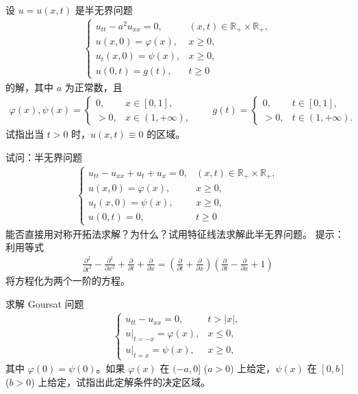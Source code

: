 \documentclass[../../main.tex]{subfiles}%
\begin{document}
\begin{example}
设 $u=u(x,t)$ 是半无界问题
\begin{align*}
\begin{cases}
u_{tt}-a^2u_{xx}=0, & (x,t)\in\mathbb{R}_+\times\mathbb{R}_+, \\
u(x,0)=\varphi(x), & x\geqslant 0, \\
u_t(x,0)=\psi(x), & x\geqslant 0, \\
u(0,t)=g(t), & t\geqslant 0
\end{cases}
\end{align*}
的解，其中 $a$ 为正常数，且
\begin{align*}
\varphi(x),\psi(x)=\begin{cases}
0, & x\in[0,1], \\
>0, & x\in(1,+\infty),
\end{cases}\qquad
g(t)=\begin{cases}
0, & t\in[0,1], \\
>0, & t\in(1,+\infty).
\end{cases}
\end{align*}
试指出当 $t>0$ 时，$u(x,t)\equiv 0$ 的区域。
\end{example}

\begin{example}
试问：半无界问题
\begin{align*}
\begin{cases}
u_{tt}-u_{xx}+u_t+u_x=0, & (x,t)\in\mathbb{R}_+\times\mathbb{R}_+, \\
u(x,0)=\varphi(x), & x\geqslant 0, \\
u_t(x,0)=\psi(x), & x\geqslant 0, \\
u(0,t)=0, & t\geqslant 0
\end{cases}
\end{align*}
能否直接用对称开拓法求解？为什么？试用特征线法求解此半无界问题。
提示：利用等式
\begin{align*}
\frac{\partial^2}{\partial t^2}-\frac{\partial^2}{\partial x^2}+\frac{\partial}{\partial t}+\frac{\partial}{\partial x}
=\left(\frac{\partial}{\partial t}+\frac{\partial}{\partial x}\right)\left(\frac{\partial}{\partial t}-\frac{\partial}{\partial x}+1\right)
\end{align*}
将方程化为两个一阶的方程。
\end{example}

\begin{example}
求解 Goursat 问题
\begin{align*}
\begin{cases}
u_{tt}-u_{xx}=0, & t>|x|, \\
u|_{t=-x}=\varphi(x), & x\leqslant 0, \\
u|_{t=x}=\psi(x), & x\geqslant 0,
\end{cases}
\end{align*}
其中 $\varphi(0)=\psi(0)$。如果 $\varphi(x)$ 在 $(-a,0]$ ($a>0$) 上给定，$\psi(x)$ 在 $[0,b]$ ($b>0$) 上给定，试指出此定解条件的决定区域。
\end{example}
\end{document}

